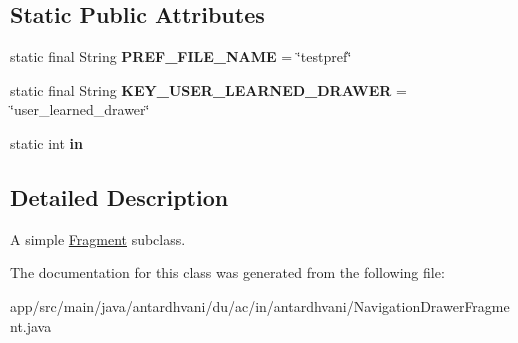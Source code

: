 \subsection*{Static Public Attributes}
\begin{DoxyCompactItemize}
\item 
\hypertarget{classantardhvani_1_1du_1_1ac_1_1in_1_1antardhvani_1_1_navigation_drawer_fragment_adc4483015d21508bfa307393106116f1}{}static final String {\bfseries P\+R\+E\+F\+\_\+\+F\+I\+L\+E\+\_\+\+N\+A\+M\+E} = \char`\"{}testpref\char`\"{}\label{classantardhvani_1_1du_1_1ac_1_1in_1_1antardhvani_1_1_navigation_drawer_fragment_adc4483015d21508bfa307393106116f1}

\item 
\hypertarget{classantardhvani_1_1du_1_1ac_1_1in_1_1antardhvani_1_1_navigation_drawer_fragment_a43d630d4a77167f13d2919eff263ba6c}{}static final String {\bfseries K\+E\+Y\+\_\+\+U\+S\+E\+R\+\_\+\+L\+E\+A\+R\+N\+E\+D\+\_\+\+D\+R\+A\+W\+E\+R} = \char`\"{}user\+\_\+learned\+\_\+drawer\char`\"{}\label{classantardhvani_1_1du_1_1ac_1_1in_1_1antardhvani_1_1_navigation_drawer_fragment_a43d630d4a77167f13d2919eff263ba6c}

\item 
\hypertarget{classantardhvani_1_1du_1_1ac_1_1in_1_1antardhvani_1_1_navigation_drawer_fragment_ab1277f942821384d5ad92a14acff3d57}{}static int {\bfseries in}\label{classantardhvani_1_1du_1_1ac_1_1in_1_1antardhvani_1_1_navigation_drawer_fragment_ab1277f942821384d5ad92a14acff3d57}

\end{DoxyCompactItemize}


\subsection{Detailed Description}
A simple \hyperlink{}{Fragment} subclass. 

The documentation for this class was generated from the following file\+:\begin{DoxyCompactItemize}
\item 
app/src/main/java/antardhvani/du/ac/in/antardhvani/Navigation\+Drawer\+Fragment.\+java\end{DoxyCompactItemize}
